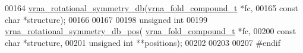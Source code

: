\begin{DoxyCode}
00164 \hyperlink{group__combinatorics__utils_gad42ffd53025bed9d636d811748db7c5a}{vrna\_rotational\_symmetry\_db}(\hyperlink{group__fold__compound_structvrna__fc__s}{vrna\_fold\_compound\_t}  *fc,
00165                             \textcolor{keyword}{const} \textcolor{keywordtype}{char}            *structure);
00166 
00167 
00198 \textcolor{keywordtype}{unsigned} \textcolor{keywordtype}{int}
00199 \hyperlink{group__combinatorics__utils_ga2a4227ebe28dbc7ad55444a3a1bf7119}{vrna\_rotational\_symmetry\_db\_pos}(
      \hyperlink{group__fold__compound_structvrna__fc__s}{vrna\_fold\_compound\_t}  *fc,
00200                                 \textcolor{keyword}{const} \textcolor{keywordtype}{char}            *structure,
00201                                 \textcolor{keywordtype}{unsigned} \textcolor{keywordtype}{int}          **positions);
00202 
00203 
00207 \textcolor{preprocessor}{#endif}
\end{DoxyCode}
